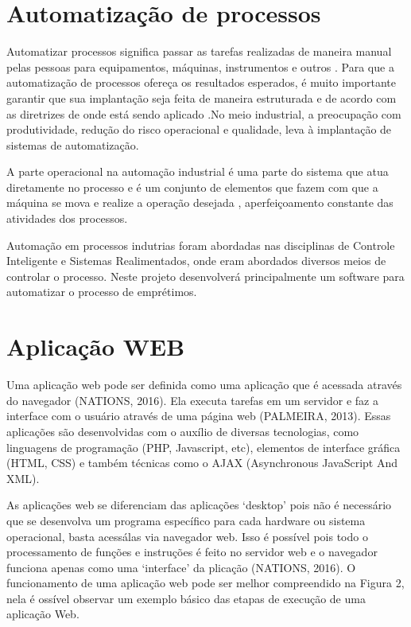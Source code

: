 \vspace{-42pt}
\section[Automatização de processos]{Automatização de processos}
Automatizar processos significa passar as tarefas realizadas de maneira manual pelas pessoas para equipamentos, máquinas, instrumentos e outros \cite{AutomatProcess}. Para que a automatização de processos ofereça os resultados esperados, é muito importante garantir que sua implantação seja feita de maneira estruturada e de acordo com as diretrizes de onde está sendo aplicado \cite{AutomatProcess2}.No meio industrial, a preocupação com produtividade, redução do risco operacional e qualidade, leva à implantação de sistemas de automatização. 

A parte operacional na automação industrial é uma parte do sistema que atua diretamente no processo e é um conjunto de elementos que fazem com que a máquina se mova e realize a operação desejada \cite{AutomatProcess3}, aperfeiçoamento constante das atividades dos processos.

Automação em processos indutrias foram abordadas nas disciplinas de Controle Inteligente e Sistemas Realimentados, onde eram abordados diversos meios de controlar o processo. Neste projeto desenvolverá principalmente um software para automatizar o processo de emprétimos.

\section[Aplicação WEB]{Aplicação WEB}
Uma aplicação web pode ser definida como uma aplicação que é acessada através do navegador (NATIONS, 2016). Ela executa tarefas em um servidor e faz a interface com o usuário através de uma página web (PALMEIRA, 2013). Essas aplicações são desenvolvidas com o auxílio de diversas tecnologias, como linguagens de programação (PHP, Javascript, etc), elementos de interface gráfica (HTML, CSS) e também técnicas como o AJAX (Asynchronous JavaScript And XML).

As aplicações web se diferenciam das aplicações ‘desktop’ pois não é necessário que se desenvolva um programa específico para cada hardware ou sistema operacional, basta acessálas via navegador web. Isso é possível pois todo o processamento de funções e instruções é feito no servidor web e o navegador funciona apenas como uma ‘interface’ da  plicação (NATIONS, 2016). O funcionamento de uma aplicação web pode ser melhor compreendido na Figura 2, nela é ossível observar um exemplo básico das etapas de execução de uma aplicação Web.

